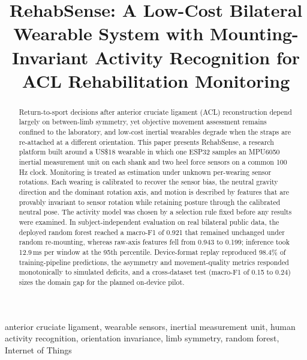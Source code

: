 \documentclass[conference]{IEEEtran}
\begin{document}
\title{RehabSense: A Low-Cost Bilateral Wearable System with Mounting-Invariant Activity Recognition for ACL Rehabilitation Monitoring}

\author{
}

\maketitle

\begin{abstract}
Return-to-sport decisions after anterior cruciate ligament (ACL) reconstruction depend largely on between-limb symmetry, yet objective movement assessment remains confined to the laboratory, and low-cost inertial wearables degrade when the straps are re-attached at a different orientation. This paper presents RehabSense, a research platform built around a US\$18 wearable in which one ESP32 samples an MPU6050 inertial measurement unit on each shank and two heel force sensors on a common 100\,Hz clock. Monitoring is treated as estimation under unknown per-wearing sensor rotations. Each wearing is calibrated to recover the sensor bias, the neutral gravity direction and the dominant rotation axis, and motion is described by features that are provably invariant to sensor rotation while retaining posture through the calibrated neutral pose. The activity model was chosen by a selection rule fixed before any results were examined. In subject-independent evaluation on real bilateral public data, the deployed random forest reached a macro-F1 of 0.921 that remained unchanged under random re-mounting, whereas raw-axis features fell from 0.943 to 0.199; inference took 12.9\,ms per window at the 95th percentile. Device-format replay reproduced 98.4\% of training-pipeline predictions, the asymmetry and movement-quality metrics responded monotonically to simulated deficits, and a cross-dataset test (macro-F1 of 0.15 to 0.24) sizes the domain gap for the planned on-device pilot.
\end{abstract}

\begin{IEEEkeywords}
anterior cruciate ligament, wearable sensors, inertial measurement unit, human activity recognition, orientation invariance, limb symmetry, random forest, Internet of Things
\end{IEEEkeywords}
\end{document}
